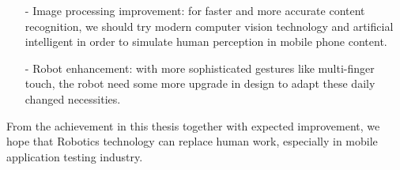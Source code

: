 	\begin{itemize}
		\item[-] Image processing improvement: for faster and more accurate content recognition, we should try modern computer vision technology and artificial intelligent in order to simulate human perception in mobile phone content. 
		\item[-] Robot enhancement: with more sophisticated gestures like multi-finger touch, the robot need some more upgrade in design to adapt these daily changed necessities.
	\end{itemize}

From the achievement in this thesis together with expected improvement, we hope that Robotics technology can replace human work, especially in mobile application testing industry.